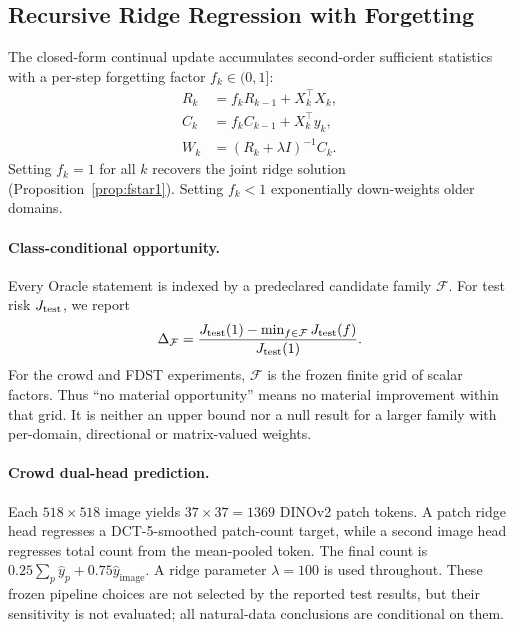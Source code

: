 \documentclass[10pt]{article}
\begin{document}
\subsection{Recursive Ridge Regression with Forgetting}

The closed-form continual update accumulates second-order sufficient
statistics with a per-step forgetting factor $f_k \in (0,1]$:
\begin{align}
  R_k &= f_k R_{k-1} + X_k^\top X_k, \label{eq:R}\\
  C_k &= f_k C_{k-1} + X_k^\top y_k, \label{eq:C}\\
  W_k &= (R_k + \lambda I)^{-1} C_k. \label{eq:W}
\end{align}
Setting $f_k=1$ for all $k$ recovers the joint ridge solution
(Proposition~\ref{prop:fstar1}).
Setting $f_k<1$ exponentially down-weights older domains.

\paragraph{Class-conditional opportunity.}
Every Oracle statement is indexed by a predeclared candidate family
$\mathcal F$. For test risk $J_{\rm test}$, we report
\begin{equation}
  \Delta_{\mathcal F}=
  \frac{J_{\rm test}(1)-\min_{f\in\mathcal F}J_{\rm test}(f)}
       {J_{\rm test}(1)}.
  \label{eq:class_opportunity}
\end{equation}
For the crowd and FDST experiments, $\mathcal F$ is the frozen finite grid of
scalar factors. Thus ``no material opportunity'' means no material improvement
within that grid. It is neither an upper bound nor a null result for a larger
family with per-domain, directional or matrix-valued weights.

\paragraph{Crowd dual-head prediction.}
Each $518{\times}518$ image yields $37{\times}37=1369$ DINOv2 patch
tokens.  A patch ridge head regresses a DCT-5-smoothed patch-count target,
while a second image head regresses total count from the mean-pooled token.
The final count is
$0.25\sum_p\hat y_p+0.75\hat y_{\mathrm{image}}$.
A ridge parameter $\lambda=100$ is used throughout. These frozen pipeline
choices are not selected by the reported test results, but their sensitivity
is not evaluated; all natural-data conclusions are conditional on them.
\end{document}
